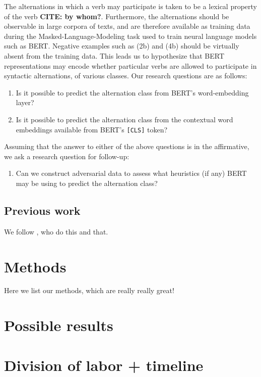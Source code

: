 \documentclass[11pt]{article}
\begin{document}
The alternations in which a verb may participate is taken to be a lexical property of the verb \textbf{CITE: by whom?}.  Furthermore, the alternations should be observable in large corpora of texts, and are therefore available as training data during the Masked-Language-Modeling task used to train neural language models such as BERT.  Negative examples such as (2b) and (4b) should be virtually absent from the training data.  This leads us to hypothesize that BERT representations may encode whether particular verbs are allowed to participate in syntactic alternations, of various classes.  Our research questions are as follows:

\begin{enumerate}
    \item Is it possible to predict the alternation class from BERT's word-embedding layer?
    \item Is it possible to predict the alternation class from the contextual word embeddings available from BERT's \texttt{[CLS]} token?
\end{enumerate}

Assuming that the answer to either of the above questions is in the affirmative, we ask a research question for follow-up:

\begin{enumerate}[resume]
    \item Can we construct adversarial data to assess what heuristics (if any) BERT may be using to predict the alternation class?
\end{enumerate}

\subsection{Previous work}
We follow \citet{kann2018verb}, who do this and that.


\section{Methods}

Here we list our methods, which are really really great!

\section{Possible results}

\section{Division of labor + timeline}


\end{document}
